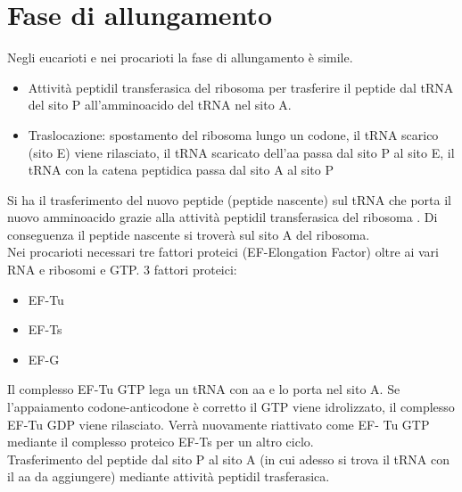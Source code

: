 \documentclass{article}
\begin{document}
\section{Fase di allungamento}
Negli eucarioti e nei procarioti la fase di allungamento è simile.
\begin{itemize}
    \item Attività peptidil transferasica del ribosoma per trasferire il peptide
    dal tRNA del sito P all'amminoacido del tRNA nel sito A.
    \item Traslocazione: spostamento del ribosoma lungo un codone, il tRNA scarico (sito E) viene rilasciato, il tRNA
    scaricato dell'aa passa dal sito P al sito E, il tRNA con la catena peptidica passa dal sito A al sito P
\end{itemize}
Si ha il trasferimento del nuovo peptide (peptide nascente) sul tRNA che porta il nuovo amminoacido grazie alla attività
peptidil transferasica del ribosoma . Di conseguenza il peptide nascente si troverà sul sito A del ribosoma.\\
Nei procarioti necessari tre fattori proteici (EF-Elongation Factor) oltre ai vari RNA e ribosomi e GTP. 3 fattori proteici:
\begin{itemize}
    \item EF-Tu
    \item EF-Ts
    \item EF-G
\end{itemize}
Il complesso EF-Tu GTP lega un tRNA con aa e lo porta nel sito A. Se l'appaiamento codone-anticodone
è corretto il GTP viene idrolizzato, il complesso EF-Tu GDP viene rilasciato. Verrà nuovamente riattivato come EF-
Tu GTP mediante il complesso proteico EF-Ts per un altro ciclo.\\
Trasferimento del peptide dal sito P al sito A (in cui adesso si trova il tRNA con il aa da aggiungere) mediante attività peptidil trasferasica.
\end{document}
